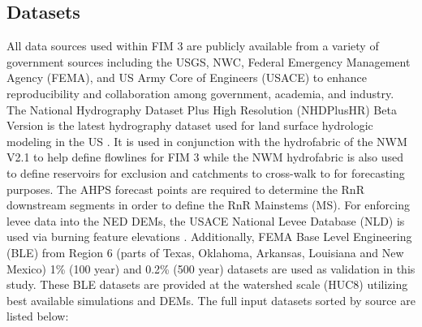 \subsection{Datasets}
%
All data sources used within FIM 3 are publicly available from a variety of government sources including the USGS, NWC, Federal Emergency Management Agency (FEMA), and US Army Core of Engineers (USACE) to enhance reproducibility and collaboration among government, academia, and industry.
The National Hydrography Dataset Plus High Resolution (NHDPlusHR) Beta Version is the latest hydrography dataset used for land surface hydrologic modeling in the US \cite{moore2019user}. 
It is used in conjunction with the hydrofabric of the NWM V2.1 to help define flowlines for FIM 3 while the NWM hydrofabric is also used to define reservoirs for exclusion and catchments to cross-walk to for forecasting purposes.
The AHPS forecast points are required to determine the RnR downstream segments in order to define the RnR Mainstems (MS).
For enforcing levee data into the NED DEMs, the USACE National Levee Database (NLD) is used via burning feature elevations \cite{engineers2016national}.
Additionally, FEMA Base Level Engineering (BLE) from Region 6 (parts of Texas, Oklahoma, Arkansas, Louisiana and New Mexico) 1\% (100 year) and 0.2\% (500 year) datasets are used as validation in this study. 
These BLE datasets are provided at the watershed scale (HUC8) utilizing best available simulations and DEMs.
The full input datasets sorted by source are listed below:
%
